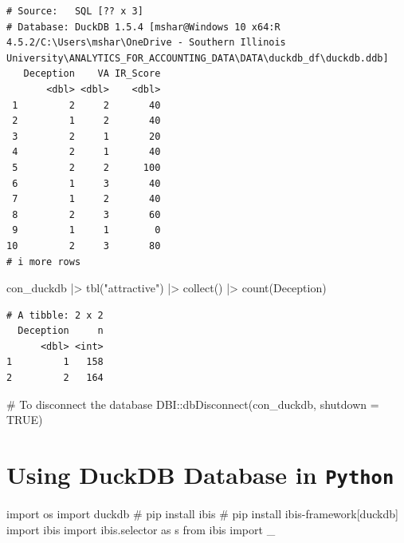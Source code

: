 \documentclass[
  letterpaper,
  DIV=11,
  numbers=noendperiod]{scrreprt}
\newenvironment{Shaded}{\begin{snugshade}}{\end{snugshade}}
\newcommand{\AttributeTok}[1]{\textcolor[rgb]{0.40,0.45,0.13}{#1}}
\newcommand{\CommentTok}[1]{\textcolor[rgb]{0.37,0.37,0.37}{#1}}
\newcommand{\ConstantTok}[1]{\textcolor[rgb]{0.56,0.35,0.01}{#1}}
\newcommand{\FunctionTok}[1]{\textcolor[rgb]{0.28,0.35,0.67}{#1}}
\newcommand{\ImportTok}[1]{\textcolor[rgb]{0.00,0.46,0.62}{#1}}
\newcommand{\NormalTok}[1]{\textcolor[rgb]{0.00,0.23,0.31}{#1}}
\newcommand{\SpecialCharTok}[1]{\textcolor[rgb]{0.37,0.37,0.37}{#1}}
\newcommand{\StringTok}[1]{\textcolor[rgb]{0.13,0.47,0.30}{#1}}
\begin{document}
\begin{verbatim}
# Source:   SQL [?? x 3]
# Database: DuckDB 1.5.4 [mshar@Windows 10 x64:R 4.5.2/C:\Users\mshar\OneDrive - Southern Illinois University\ANALYTICS_FOR_ACCOUNTING_DATA\DATA\duckdb_df\duckdb.ddb]
   Deception    VA IR_Score
       <dbl> <dbl>    <dbl>
 1         2     2       40
 2         1     2       40
 3         2     1       20
 4         2     1       40
 5         2     2      100
 6         1     3       40
 7         1     2       40
 8         2     3       60
 9         1     1        0
10         2     3       80
# i more rows
\end{verbatim}

\begin{Shaded}
\begin{Highlighting}[]
\NormalTok{con\_duckdb }\SpecialCharTok{|\textgreater{}} 
  \FunctionTok{tbl}\NormalTok{(}\StringTok{"attractive"}\NormalTok{) }\SpecialCharTok{|\textgreater{}} 
  \FunctionTok{collect}\NormalTok{() }\SpecialCharTok{|\textgreater{}} 
  \FunctionTok{count}\NormalTok{(Deception)}
\end{Highlighting}
\end{Shaded}

\begin{verbatim}
# A tibble: 2 x 2
  Deception     n
      <dbl> <int>
1         1   158
2         2   164
\end{verbatim}

\begin{Shaded}
\begin{Highlighting}[]
\CommentTok{\# To disconnect the database }
\NormalTok{DBI}\SpecialCharTok{::}\FunctionTok{dbDisconnect}\NormalTok{(con\_duckdb, }\AttributeTok{shutdown =} \ConstantTok{TRUE}\NormalTok{)}
\end{Highlighting}
\end{Shaded}

\section{\texorpdfstring{Using DuckDB Database in
\texttt{Python}}{Using DuckDB Database in Python}}\label{using-duckdb-database-in-python}

\begin{Shaded}
\begin{Highlighting}[]
\ImportTok{import}\NormalTok{ os}
\ImportTok{import}\NormalTok{ duckdb}
\CommentTok{\# pip install ibis }
\CommentTok{\# pip install ibis{-}framework[duckdb]}
\ImportTok{import}\NormalTok{ ibis }
\ImportTok{import}\NormalTok{ ibis.selector }\ImportTok{as}\NormalTok{ s }
\ImportTok{from}\NormalTok{ ibis }\ImportTok{import}\NormalTok{ \_}
\end{Highlighting}
\end{Shaded}
\end{document}
